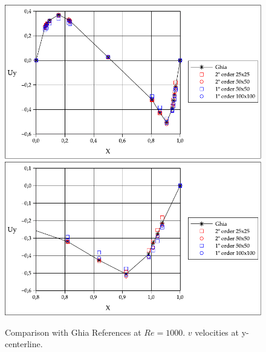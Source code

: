 \documentclass[a4paper,conference]{IEEEtran}
\begin{document}
\begin{figure}[htbp]
  \begin{center}
      \includegraphics[width=.85\linewidth]{images/Re_1000_Uy_v2.pdf}
      \includegraphics[width=.85\linewidth]{images/Re_1000_Uy_v2_zoom.pdf}
  \end{center}
  \caption{\label{fg:Re1000v} Comparison with Ghia References at $Re=1000$. $v$ velocities at y-centerline.}
\end{figure}
\end{document}
